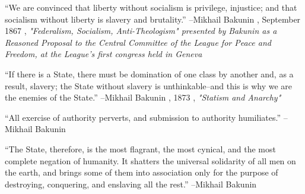 \documentclass{article}%
\begin{document}
\linebreak%
\vspace{1mm}%
\begin{minipage}{\textwidth}%
\flushleft%
“We are convinced that liberty without socialism is privilege, injustice; and that socialism without liberty is slavery and brutality.”%
\linebreak%
\vspace{1mm}%
–Mikhail Bakunin%
, September 1867%
, \textit{"Federalism, Socialism, Anti-Theologism" presented by Bakunin as a Reasoned Proposal  to the Central Committee of the League for Peace and Freedom, at the League's first  congress held in Geneva}%
\linebreak%
\vspace{1mm}%
\end{minipage}%
\linebreak%
\vspace{1mm}%
\begin{minipage}{\textwidth}%
\flushleft%
“If there is a State, there must be domination of one class by another and, as a result, slavery; the State without slavery is unthinkable–and this is why we are the enemies of the State.”%
\linebreak%
\vspace{1mm}%
–Mikhail Bakunin%
, 1873%
, \textit{"Statism and Anarchy"}%
\linebreak%
\vspace{1mm}%
\end{minipage}%
\linebreak%
\vspace{1mm}%
\begin{minipage}{\textwidth}%
\flushleft%
“All exercise of authority perverts, and submission to authority humiliates.”%
\linebreak%
\vspace{1mm}%
–Mikhail Bakunin%
\linebreak%
\vspace{1mm}%
\end{minipage}%
\linebreak%
\vspace{1mm}%
\begin{minipage}{\textwidth}%
\flushleft%
“The State, therefore, is the most flagrant, the most cynical, and the most complete negation of humanity. It shatters the universal solidarity of all men on the earth, and brings some of them into association only for the purpose of destroying, conquering, and enslaving all the rest.”%
\linebreak%
\vspace{1mm}%
–Mikhail Bakunin%
\linebreak%
\vspace{1mm}%
\end{minipage}%
\end{document}
